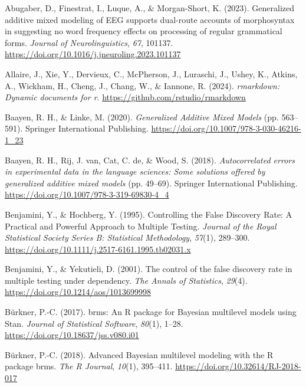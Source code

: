 \documentclass[
  doc,
  floatsintext,
  longtable,
  a4paper,
  nolmodern,
  notxfonts,
  notimes,
  colorlinks=true,linkcolor=blue,citecolor=blue,urlcolor=blue]{apa7}
\newlength{\cslhangindent}
\newenvironment{CSLReferences}[2] %
 {\begin{list}{}{%
  \setlength{\itemindent}{0pt}
  \setlength{\leftmargin}{0pt}
  \setlength{\parsep}{0pt}
  \ifodd #1
   \setlength{\leftmargin}{\cslhangindent}
   \setlength{\itemindent}{-1\cslhangindent}
  \fi
  \setlength{\itemsep}{#2\baselineskip}}}
 {\end{list}}
\begin{document}
\label{refs}
\begin{CSLReferences}{1}{0}
Abugaber, D., Finestrat, I., Luque, A., \& Morgan-Short, K. (2023).
Generalized additive mixed modeling of EEG supports dual-route accounts
of morphosyntax in suggesting no word frequency effects on processing of
regular grammatical forms. \emph{Journal of Neurolinguistics},
\emph{67}, 101137.
\url{https://doi.org/10.1016/j.jneuroling.2023.101137}

Allaire, J., Xie, Y., Dervieux, C., McPherson, J., Luraschi, J., Ushey,
K., Atkins, A., Wickham, H., Cheng, J., Chang, W., \& Iannone, R.
(2024). \emph{{rmarkdown}: Dynamic documents for r}.
\url{https://github.com/rstudio/rmarkdown}

Baayen, R. H., \& Linke, M. (2020). \emph{Generalized Additive Mixed
Models} (pp. 563--591). Springer International Publishing.
\url{https://doi.org/10.1007/978-3-030-46216-1_23}

Baayen, R. H., Rij, J. van, Cat, C. de, \& Wood, S. (2018).
\emph{Autocorrelated errors in experimental data in the language
sciences: Some solutions offered by generalized additive mixed models}
(pp. 49--69). Springer International Publishing.
\url{https://doi.org/10.1007/978-3-319-69830-4_4}

Benjamini, Y., \& Hochberg, Y. (1995). Controlling the False Discovery
Rate: A Practical and Powerful Approach to Multiple Testing.
\emph{Journal of the Royal Statistical Society Series B: Statistical
Methodology}, \emph{57}(1), 289--300.
\url{https://doi.org/10.1111/j.2517-6161.1995.tb02031.x}

Benjamini, Y., \& Yekutieli, D. (2001). The control of the false
discovery rate in multiple testing under dependency. \emph{The Annals of
Statistics}, \emph{29}(4). \url{https://doi.org/10.1214/aos/1013699998}

Bürkner, P.-C. (2017). {brms}: An {R} package for {Bayesian} multilevel
models using {Stan}. \emph{Journal of Statistical Software},
\emph{80}(1), 1--28. \url{https://doi.org/10.18637/jss.v080.i01}

Bürkner, P.-C. (2018). Advanced {Bayesian} multilevel modeling with the
{R} package {brms}. \emph{The R Journal}, \emph{10}(1), 395--411.
\url{https://doi.org/10.32614/RJ-2018-017}


\end{CSLReferences}
\end{document}

